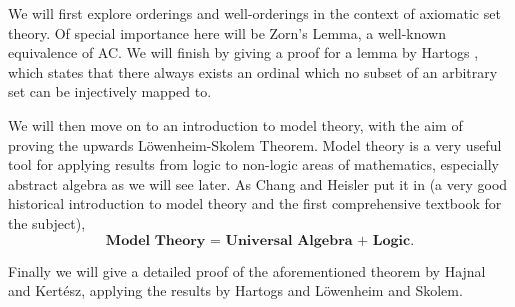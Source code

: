 \documentclass[../../main.tex]{subfiles}
\begin{document}
We will first explore orderings and well-orderings in the context of axiomatic set theory.
Of special importance here will be Zorn's Lemma, a well-known equivalence of AC.
We will finish by giving a proof for a lemma by Hartogs \cite{Har15}, which states that there always exists an ordinal which no subset of an arbitrary set can be injectively mapped to.

We will then move on to an introduction to model theory, with the aim of proving the upwards Löwenheim-Skolem Theorem.
Model theory is a very useful tool for applying results from logic to non-logic areas of mathematics, especially abstract algebra as we will see later.
As Chang and Heisler put it in \cite{Cha90} (a very good historical introduction to model theory and the first comprehensive textbook for the subject), $$\textbf{Model Theory = Universal Algebra + Logic}.$$

Finally we will give a detailed proof of the aforementioned theorem by Hajnal and Kertész, applying the results by Hartogs and Löwenheim and Skolem.
\end{document}
